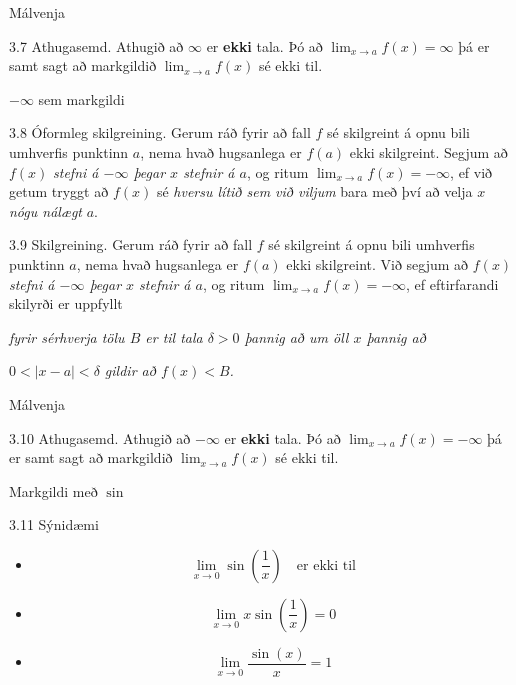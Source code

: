 \documentclass[icelandic,a4paper,12pt]{article}
\begin{document}
\begin{frame}{Málvenja}
 \begin{block}{3.7 Athugasemd.}  Athugið að $\infty$ er {\bf ekki} tala.  Þó 
að  $\lim_{x\rightarrow a} f(x)=\infty$ þá er samt sagt að
markgildið $\lim_{x\rightarrow a} f(x)$ sé ekki til.
 \end{block}
\end{frame}

\begin{frame}{$-\infty$ sem markgildi}
 \begin{block}{3.8 Óformleg skilgreining.}  Gerum ráð fyrir að fall $f$ sé
skilgreint á opnu bili umhverfis punktinn $a$, nema hvað hugsanlega er
$f(a)$ ekki skilgreint.  Segjum að  $f(x)$
{\it stefni á $-\infty$ þegar $x$ stefnir á $a$}, og ritum
$\lim_{x\rightarrow a} f(x)=-\infty$, ef við getum tryggt að  $f(x)$ sé {\em
  hversu lítið sem við viljum}
 bara með því að velja $x$ {\em nógu nálægt} $a$.  

 \end{block}
\pause
\begin{block}{3.9 Skilgreining.}
 Gerum ráð fyrir að fall $f$ sé
skilgreint á opnu bili umhverfis punktinn $a$, nema hvað hugsanlega er
$f(a)$ ekki skilgreint.  Við segjum að $f(x)$
{\it stefni á $-\infty$ þegar $x$ stefnir á $a$}, og ritum
$\lim_{x\rightarrow a} f(x)=-\infty$, ef eftirfarandi skilyrði er uppfyllt

{\it fyrir sérhverja tölu $B$ er til tala $\delta>0$ þannig
  að um öll $x$ þannig að} 

{\em $0<|x-a|<\delta$ 
gildir að  $f(x)<B$.}
\end{block}

\end{frame}

\begin{frame}{Málvenja}
 \begin{block}{3.10 Athugasemd.}  Athugið að $-\infty$ er {\bf ekki} tala.  Þó 
að  $\lim_{x\rightarrow a} f(x)=-\infty$ þá er samt sagt að
markgildið $\lim_{x\rightarrow a} f(x)$ sé ekki til.
 \end{block}
\end{frame}

\begin{frame}{Markgildi með $\sin$}
\begin{block}{3.11 Sýnidæmi}
\begin{itemize}
  \item $$\lim_{x\to 0} \sin\left(\frac 1x\right) \quad \text{er ekki til}$$
  \pause
  \item $$\lim_{x\to 0} x\sin\left(\frac 1x\right) = 0$$
  \pause
  \item $$\lim_{x \to 0} \frac{\sin(x)}{x} = 1$$
\end{itemize}
\end{block}
\end{frame}
\end{document}
